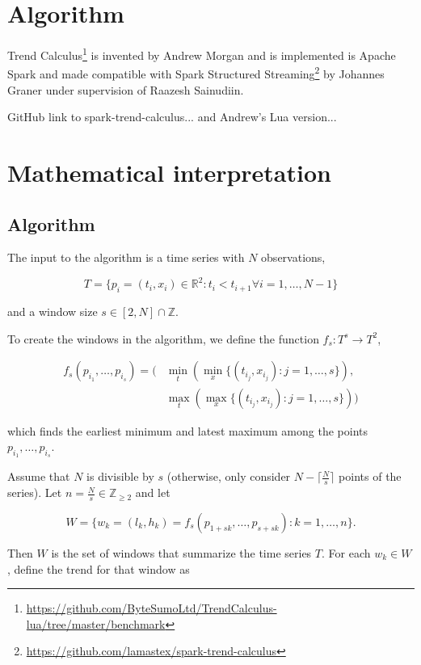 \documentclass[a4paper, 12pt]{article}
\begin{document}
\section{Algorithm}

Trend Calculus\footnote{\url{https://github.com/ByteSumoLtd/TrendCalculus-lua/tree/master/benchmark}} is invented by Andrew Morgan and is implemented is Apache Spark and made compatible with Spark Structured Streaming\footnote{\url{https://github.com/lamastex/spark-trend-calculus}} by Johannes Graner under supervision of Raazesh Sainudiin.

GitHub link to spark-trend-calculus... and Andrew's Lua version...

\section{Mathematical interpretation}

\subsection{Algorithm}

The input to the algorithm is a time series with $N$ observations, 

\[ T = \{ p_i = (t_i, x_i) \in \mathbb{R}^2 : t_i < t_{i+1} \forall i = 1, \dots, N-1 \} \]

and a window size $s \in [2, N] \cap \mathbb{Z}$.

To create the windows in the algorithm, we define the function $f_s : T^s \to T^2$,

\begin{align*}
    f_s(p_{i_1}, \dots, p_{i_s}) = ( & \min_t (\min_x \{ (t_{i_j}, x_{i_j}) : j = 1,\dots,s \}), \\
    & \max_t (\max_x \{ (t_{i_j}, x_{i_j}) : j = 1,\dots,s \}) )
\end{align*}

which finds the earliest minimum and latest maximum among the points $p_{i_1},\dots,p_{i_s}$.

Assume that $N$ is divisible by $s$ (otherwise, only consider $N - \lceil\frac{N}{s} \rceil$ points of the series). Let $n = \frac{N}{s} \in \mathbb{Z}_{\ge 2}$ and let 

\begin{equation*}
    W = \{ w_k = (l_k, h_k) = f_s(p_{1+sk},\dots,p_{s+sk}) : k = 1,\dots,n\}. 
\end{equation*}

Then $W$ is the set of windows that summarize the time series $T$. For each $w_k \in W$, define the trend for that window as 
\end{document}

